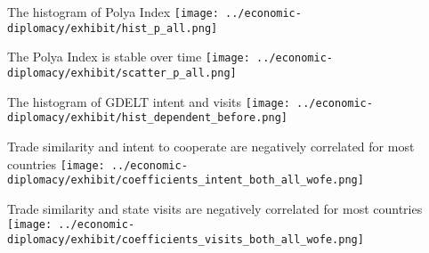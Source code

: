 \documentclass[
  ignorenonframetext,
  aspectratio=16,
]{beamer}
\begin{document}
\begin{frame}{The histogram of Polya Index}
\protect\hypertarget{the-histogram-of-polya-index}{}
\texttt{[image: ../economic-diplomacy/exhibit/hist\_p\_all.png]}
\end{frame}

\begin{frame}{The Polya Index is stable over time}
\protect\hypertarget{the-polya-index-is-stable-over-time}{}
\texttt{[image: ../economic-diplomacy/exhibit/scatter\_p\_all.png]}
\end{frame}

\begin{frame}{The histogram of GDELT intent and visits}
\protect\hypertarget{the-histogram-of-gdelt-intent-and-visits}{}
\texttt{[image: ../economic-diplomacy/exhibit/hist\_dependent\_before.png]}
\end{frame}

\begin{frame}{Trade similarity and intent to cooperate are negatively
correlated for most countries}
\protect\hypertarget{trade-similarity-and-intent-to-cooperate-are-negatively-correlated-for-most-countries}{}
\texttt{[image: ../economic-diplomacy/exhibit/coefficients\_intent\_both\_all\_wofe.png]}
\end{frame}

\begin{frame}{Trade similarity and state visits are negatively
correlated for most countries}
\protect\hypertarget{trade-similarity-and-state-visits-are-negatively-correlated-for-most-countries}{}
\texttt{[image: ../economic-diplomacy/exhibit/coefficients\_visits\_both\_all\_wofe.png]}
\end{frame}
\end{document}
